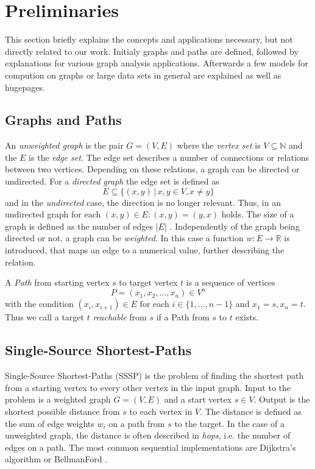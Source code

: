 
\section{Preliminaries}
This section briefly explains the concepts and applications necessary, but not directly related to our work.
Initialy graphs and paths are defined, followed by explanations for various graph analysis applications.
Afterwards a few models for compution on graphs or large data sets in general are explained as well as hugepages.

\subsection{Graphs and Paths}
An \emph{unweighted graph} is the pair $G=(V,E)$ where the \emph{vertex set} is $V\subseteq\mathbb N$ and the $E$ is the \emph{edge set}.
The edge set describes a number of connections or relations between two vertices. Depending on these relations, a graph can be directed or undirected. For a \emph{directed graph} the edge set is defined as
\begin{equation*}
  E\subseteq\{(x,y)\,|\, x,y\in V, x\neq y\}
\end{equation*}
and in the \emph{undirected} case, the direction is no longer relevant. Thus, in an undirected graph for each $(x,y)\in E: (x,y)=(y,x)$ holds.
The size of a graph is defined as the number of edges $|E|$ \cite{newman2010networks}.
Independently of the graph being directed or not, a graph can be \emph{weighted}. In this case a function $w:E\rightarrow \mathbb R$ is introduced, that maps an edge to a numerical value, further describing the relation.

A \emph{Path} from starting vertex $s$ to target vertex $t$ is a sequence of vertices
\begin{equation*}
	P=(x_1,x_2,\ldots,x_n)\in V^n
\end{equation*}
with the condition $(x_i,x_{i+1})\in E$ for each $i\in\{1,\ldots,n-1\}$ and $x_1=s, x_n=t$.
Thus we call a target $t$ \emph{reachable} from $s$ if a Path from $s$ to $t$ exists.

\subsection{Single-Source Shortest-Paths}
Single-Source Shortest-Paths (SSSP) is the problem of finding the shortest path from a starting vertex to every other vertex in the input graph.
Input to the problem is a weighted graph $G=(V,E)$ and a start vertex $s\in V$. Output is the shortest possible distance from $s$ to each vertex in $V$.
The distance is defined as the sum of edge weights $w_i$ on a path from $s$ to the target.
In the case of a unweighted graph, the distance is often described in \emph{hops}, i.e. the number of edges on a path.
The most common sequential implementations are Dijkstra's algorithm or BellmanFord \cite{Polymer, Ligra, pregel}.

